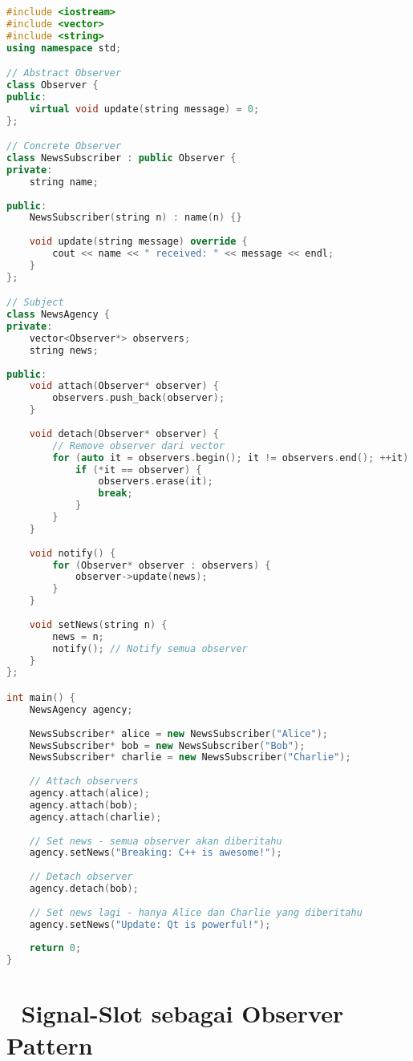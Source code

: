 \begin{lstlisting}[language=c++, caption=Observer Pattern Implementation]
#include <iostream>
#include <vector>
#include <string>
using namespace std;

// Abstract Observer
class Observer {
public:
    virtual void update(string message) = 0;
};

// Concrete Observer
class NewsSubscriber : public Observer {
private:
    string name;
    
public:
    NewsSubscriber(string n) : name(n) {}
    
    void update(string message) override {
        cout << name << " received: " << message << endl;
    }
};

// Subject
class NewsAgency {
private:
    vector<Observer*> observers;
    string news;
    
public:
    void attach(Observer* observer) {
        observers.push_back(observer);
    }
    
    void detach(Observer* observer) {
        // Remove observer dari vector
        for (auto it = observers.begin(); it != observers.end(); ++it) {
            if (*it == observer) {
                observers.erase(it);
                break;
            }
        }
    }
    
    void notify() {
        for (Observer* observer : observers) {
            observer->update(news);
        }
    }
    
    void setNews(string n) {
        news = n;
        notify(); // Notify semua observer
    }
};

int main() {
    NewsAgency agency;
    
    NewsSubscriber* alice = new NewsSubscriber("Alice");
    NewsSubscriber* bob = new NewsSubscriber("Bob");
    NewsSubscriber* charlie = new NewsSubscriber("Charlie");
    
    // Attach observers
    agency.attach(alice);
    agency.attach(bob);
    agency.attach(charlie);
    
    // Set news - semua observer akan diberitahu
    agency.setNews("Breaking: C++ is awesome!");
    
    // Detach observer
    agency.detach(bob);
    
    // Set news lagi - hanya Alice dan Charlie yang diberitahu
    agency.setNews("Update: Qt is powerful!");
    
    return 0;
}
\end{lstlisting}

\section{🔗 Signal-Slot sebagai Observer Pattern}

